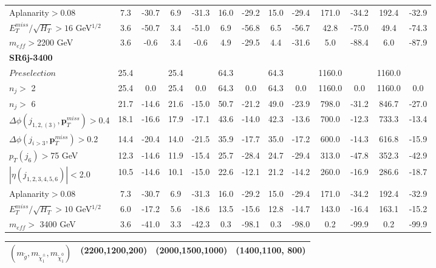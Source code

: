 \documentclass[a4paper,11pt]{article}
\begin{document}
\begin{landscape}
\begin{table}[h]
\begin{tabular}{ | l | c c c c  || c c c c || c c c c | }
\\
Aplanarity$>$0.08&7.3&-30.7&6.9&-31.3&16.0&-29.2&15.0&-29.4&171.0&-34.2&192.4&-32.9
\\
$E_T^{miss}/\sqrt{H_T}>16 $ GeV$^{1/2}$&3.6&-50.7&3.4&-51.0&6.9&-56.8&6.5&-56.7&42.8&-75.0&49.4&-74.3
\\
$m_{eff}>$2200 GeV&3.6&-0.6&3.4&-0.6&4.9&-29.5&4.4&-31.6&5.0&-88.4&6.0&-87.9
\\ \hline
											\multicolumn{13}{|l|}{\textbf{SR6j-3400}} \\ \hline		
$Preselection$&25.4&&25.4&&64.3&&64.3&&1160.0&&1160.0&
\\
$n_j>$ 2&25.4&0.0&25.4&0.0&64.3&0.0&64.3&0.0&1160.0&0.0&1160.0&0.0
\\
$n_j>$ 6&21.7&-14.6&21.6&-15.0&50.7&-21.2&49.0&-23.9&798.0&-31.2&846.7&-27.0
\\
$\Delta \phi(j_{1,2,(3)},\mathbf{p}_T^{miss})>$0.4&18.1&-16.6&17.9&-17.1&43.6&-14.0&42.3&-13.6&700.0&-12.3&733.3&-13.4
\\
$\Delta \phi(j_{i>3},\mathbf{p}_T^{miss})>$0.2&14.4&-20.4&14.0&-21.5&35.9&-17.7&35.0&-17.2&600.0&-14.3&616.8&-15.9
\\
$p_T(j_6)>$75 GeV&12.3&-14.6&11.9&-15.4&25.7&-28.4&24.7&-29.4&313.0&-47.8&352.3&-42.9
\\
$|\eta(j_{1,2,3,4,5,6})|<$2.0&10.5&-14.6&10.1&-15.0&22.6&-12.1&21.2&-14.2&260.0&-16.9&286.6&-18.7
\\
Aplanarity$>$0.08&7.3&-30.7&6.9&-31.3&16.0&-29.2&15.0&-29.4&171.0&-34.2&192.4&-32.9
\\
$E_T^{miss}/\sqrt{H_T}>10 $ GeV$^{1/2}$&6.0&-17.2&5.6&-18.6&13.5&-15.6&12.8&-14.7&143.0&-16.4&163.1&-15.2
\\
$m_{eff}> $ 3400 GeV&3.6&-41.0&3.3&-42.3&0.3&-98.1&0.3&-98.0&0.2&-99.9&0.2&-99.9
\\



				\bottomrule \bottomrule
			\end{tabular}


			
		\end{table}	
		



		\begin{table}[h]
	\centering
	\renewcommand\arraystretch{1.0} 
	\scriptsize
	\begin{tabular}{ | l | c c c c  || c c c c || c c c c | } \toprule
		$(m_{\tilde g},m_{\tilde \chi _1 ^{\pm}},m_{\tilde \chi _1 ^0})$ & \multicolumn{4}{c|}{(2200,1200,200)} &	\multicolumn{4}{c}{(2000,1500,1000)} & \multicolumn{4}{c}{(1400,1100, 800)} 
		\\ \hline 
		

\end{tabular}
\end{table}
\end{landscape}
\end{document}
